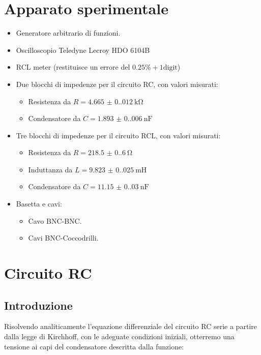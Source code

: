 \documentclass[12pt, a4paper]{article}
\begin{document}
\section{Apparato sperimentale}
\label{apparato_sperimentale}
\begin{itemize}[leftmargin=2cm]
    \item Generatore arbitrario di funzioni.
    \item Oscilloscopio Teledyne Lecroy HDO 6104B
    \item RCL meter (restituisce un errore del \(0.25\% + 1\text{digit}\))
    \item Due blocchi di impedenze per il circuito RC, con valori misurati:
    \begin{itemize}[leftmargin=1cm]
        \item Resistenza da \(R = \qty{4.665(0.012)}{\kilo\ohm} \) 
        \item Condensatore da \(C = \qty{1.893(0.006)}{\nano\farad} \) 
    \end{itemize}
    \item Tre blocchi di impedenze per il circuito RCL, con valori misurati:
    \begin{itemize}[leftmargin=1cm]
        \item Resistenza da \(R = \qty{218.5(0.6)}{\ohm} \) 
        \item Induttanza da \(L = \qty{9.823(0.025)}{\milli\henry} \) 
        \item Condensatore da \(C = \qty{11.15(0.03)}{\nano\farad} \) 
    \end{itemize}
    \item Basetta e cavi:
    \begin{itemize}[leftmargin=1cm]
        \item Cavo BNC-BNC.
        \item Cavi BNC-Coccodrilli.
    \end{itemize}
     
\end{itemize}


\section{Circuito RC}
\subsection{Introduzione}
Risolvendo analiticamente l'equazione differenziale del circuito RC serie a partire dalla legge di Kirchhoff, con le adeguate condizioni iniziali, otterremo una tensione ai capi del condensatore descritta dalla funzione:
\end{document}
